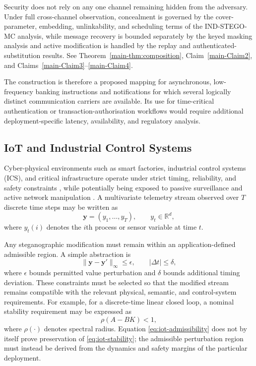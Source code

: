 \documentclass[journal]{IEEEtran}
\theoremstyle{definition}
\theoremstyle{game}
\begin{document}
Security does not rely on any one channel remaining hidden from
the adversary. Under full cross-channel observation, concealment
is governed by the cover-parameter, embedding, unlinkability, and
scheduling terms of the \textsf{IND-STEGO-MC} analysis, while
message recovery is bounded separately by the keyed masking
analysis and active modification is handled by the replay and
authenticated-substitution results. See
Theorem~\ref{main-thm:composition},
Claim~\ref{main-Claim2}, and
Claims~\ref{main-Claim3}--\ref{main-Claim4}.

The construction is therefore a proposed mapping for
asynchronous, low-frequency banking instructions and
notifications for which several logically distinct communication
carriers are available. Its use for time-critical authentication
or transaction-authorisation workflows would require additional
deployment-specific latency, availability, and regulatory
analysis.

\subsection{IoT and Industrial Control Systems}
\label{app:iot}

Cyber-physical environments such as smart factories, industrial
control systems (ICS), and critical infrastructure operate under
strict timing, reliability, and safety constraints
\cite{nist80082r3}, while potentially being exposed to passive
surveillance and active network manipulation
\cite{cisa_aa24_249a2024,opswatsans2025}. A multivariate
telemetry stream observed over $T$ discrete time steps may be
written as
\begin{equation}
\label{eq:telemetry}
\mathbf{y}
=
\left(
y_1,\ldots,y_T
\right),
\qquad
y_t\in\mathbb{R}^{d},
\end{equation}
where $y_t(i)$ denotes the $i$th process or sensor variable at
time $t$.

Any steganographic modification must remain within an
application-defined admissible region. A simple abstraction is
\begin{equation}
\label{eq:iot-admissibility}
\|\mathbf{y}-\mathbf{y}'\|_{\infty}
\leq
\epsilon,
\qquad
|\Delta t|
\leq
\delta,
\end{equation}
where $\epsilon$ bounds permitted value perturbation and
$\delta$ bounds additional timing deviation. These constraints
must be selected so that the modified stream remains compatible
with the relevant physical, semantic, and control-system
requirements. For example, for a discrete-time linear closed loop,
a nominal stability requirement may be expressed as
\begin{equation}
\label{eq:iot-stability}
\rho(A-BK)<1,
\end{equation}
where $\rho(\cdot)$ denotes spectral radius. Equation
\eqref{eq:iot-admissibility} does not by itself prove preservation
of \eqref{eq:iot-stability}; the admissible perturbation region
must instead be derived from the dynamics and safety margins of
the particular deployment.
\end{document}
